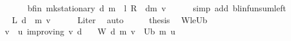 \begin{isabellebody}
\ \ \isamarkupfalse%
\ \isamarkupfalse%
\ {\isachardoublequoteopen}{\isasymdots}\ {\isacharequal}{\kern0pt}\ \ {\isasymnu}\isactrlsub b{\isacharunderscore}{\kern0pt}fin\ {\isacharparenleft}{\kern0pt}mk{\isacharunderscore}{\kern0pt}stationary\ d{\isacharparenright}{\kern0pt}\ m\ {\isacharplus}{\kern0pt}\ {\isacharparenleft}{\kern0pt}{\isacharparenleft}{\kern0pt}l\ {\isacharasterisk}{\kern0pt}\isactrlsub R\ {\isasymP}\ d{\isacharparenright}{\kern0pt}{\isacharcircum}{\kern0pt}{\isacharcircum}{\kern0pt}m{\isacharparenright}{\kern0pt}\ v{\isachardoublequoteclose}\isanewline
\ \ \ \ \isamarkupfalse%
\ {\isacharparenleft}{\kern0pt}simp\ add{\isacharcolon}{\kern0pt}\ blinfun{\isachardot}{\kern0pt}sum{\isacharunderscore}{\kern0pt}left{\isacharparenright}{\kern0pt}\isanewline
\ \ \isamarkupfalse%
\ \isamarkupfalse%
\ {\isachardoublequoteopen}{\isasymdots}\ {\isacharequal}{\kern0pt}\ {\isacharparenleft}{\kern0pt}L\ d\ {\isacharcircum}{\kern0pt}{\isacharcircum}{\kern0pt}\ m{\isacharparenright}{\kern0pt}\ v{\isachardoublequoteclose}\isanewline
\ \ \ \ \isamarkupfalse%
\ L{\isacharunderscore}{\kern0pt}iter\ \isamarkupfalse%
\ auto\isanewline
\ \ \isamarkupfalse%
\ \isamarkupfalse%
\ {\isacharquery}{\kern0pt}thesis\ \isacommand{{\isachardot}{\kern0pt}}\isamarkupfalse%
\isanewline
{}\isamarkupfalse%
%
\endisatagproof
{\isafoldproof}%
%
\isadelimproof
\isanewline
%
\endisadelimproof
\isanewline
{}\isamarkupfalse%
\ W{\isacharunderscore}{\kern0pt}le{\isacharunderscore}{\kern0pt}U\isactrlsub b{\isacharcolon}{\kern0pt}\isanewline
\ \ \ {\isachardoublequoteopen}v\ {\isasymle}\ u{\isachardoublequoteclose}\ {\isachardoublequoteopen}{\isasymnu}{\isacharunderscore}{\kern0pt}improving\ v\ d{\isachardoublequoteclose}\isanewline
\ \ \ {\isachardoublequoteopen}W\ d\ m\ v\ {\isasymle}\ U\isactrlsub b\ m\ u{\isachardoublequoteclose}\isanewline
%
\isadelimproof
%
\endisadelimproof
%
\isatagproof
{}\isamarkupfalse%
\ {\isacharminus}{\kern0pt}\isanewline
\ \ \isamarkupfalse%

\end{isabellebody}
